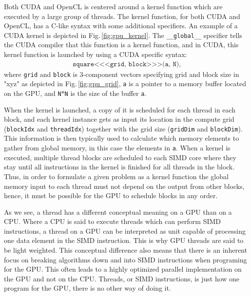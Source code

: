 Both CUDA and OpenCL is centered around a kernel function which are executed by a large group of threads. The kernel function, for both CUDA and OpenCL, has a C-like syntax with some additional specifiers. An example of a CUDA kernel is depicted in Fig.\,\ref{fig:gpu_kernel}. The \texttt{\_\_global\_\_} specifier tells the CUDA compiler that this function is a kernel function, and in CUDA, this kernel function is launched by using a CUDA specific syntax:
\begin{align*}
\texttt{square<<<grid, block>>>(a, N)},
\end{align*}
where \texttt{grid} and \texttt{block} is 3-component vectors specifying grid and block size in "xyz" as depicted in Fig.\,\ref{fig:gpu_grid}, \texttt{a} is a pointer to a memory buffer located on the GPU, and \texttt{N}$*$\texttt{N} is the size of the buffer \texttt{a}. 

When the kernel is launched, a copy of it is scheduled for each thread in each block, and each kernel instance gets as input its location in the compute grid (\texttt{blockIdx} and \texttt{threadIdx}) together with the grid size (\texttt{gridDim} and \texttt{blockDim}). This information is then typically used to calculate which memory elements to gather from global memory, in this case the elements in \texttt{a}. %
When a kernel is executed, multiple thread blocks are scheduled to each SIMD core where they stay until all instructions in the kernel is finished for all threads in the block. Thus,  in order to formulate a given problem as a kernel function the global memory input to each thread must not depend on the output from other blocks, hence, it must be possible for the GPU to schedule blocks in any order. 

As we see, a thread has a different conceptual meaning on a GPU than on a CPU.  Where a CPU is said to execute threads which can perform SIMD instructions, a thread on a GPU can be interpreted as unit capable of processing one data element in the SIMD instruction. This is why GPU threads are said to be light weighted. This conceptual difference also means that there is an inherent focus on breaking algorithms down and into SIMD instructions when programing for the GPU. This often leads to a highly optimized parallel implementation on the GPU and not on the CPU. Threads, or SIMD instructions, is just how one program for the GPU, there is no other way of doing it.

